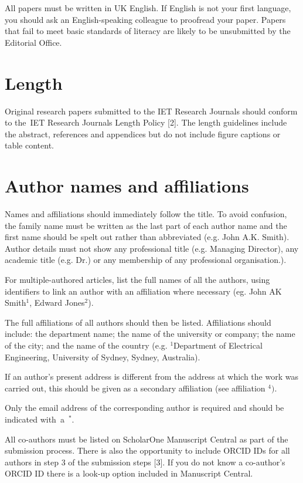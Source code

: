 \documentclass{IET}
\begin{document}
All papers must be written in UK English. If English is not your first
language, you should ask an English-speaking colleague to proofread your
paper. Papers that fail to meet basic standards of literacy are likely to be
unsubmitted by the Editorial Office.

\section{Length}

Original research papers submitted to the IET Research Journals should
conform to the~IET Research Journals Length Policy [2]. The length
guidelines include the abstract, references and appendices but do not
include figure captions or table content.

\section{Author names and affiliations}

Names and affiliations should immediately follow the title. To avoid
confusion, the family name must be written as the last part of each author
name and the first name should be spelt out rather than abbreviated (e.g.
John A.K. Smith). Author details must not show any professional title (e.g.
Managing Director), any academic title (e.g. Dr.) or any membership of any
professional organisation.).

For multiple-authored articles, list the full names of all the authors,
using identifiers to link an author with an affiliation where necessary (eg.
John AK Smith$^{1}$, Edward Jones$^{2}$).

The full affiliations of all authors should then be listed. Affiliations
should include: the department name; the name of the university or company;
the name of the city; and the name of the country (e.g.
$^{1}$Department of Electrical Engineering, University of Sydney,
Sydney, Australia).

If an author's present address is different from the address at which the
work was carried out, this should be given as a secondary affiliation (see
affiliation $^{4})$.

Only the email address of the corresponding author is required and should be
indicated with~a~$^{\ast}$.

All co-authors must be listed on ScholarOne Manuscript Central as part of
the submission process. There is also the opportunity to include ORCID IDs
for all authors in step 3 of the submission steps [3]. If you do not know a
co-author's ORCID ID there is a look-up option included in Manuscript Central.
\end{document}
